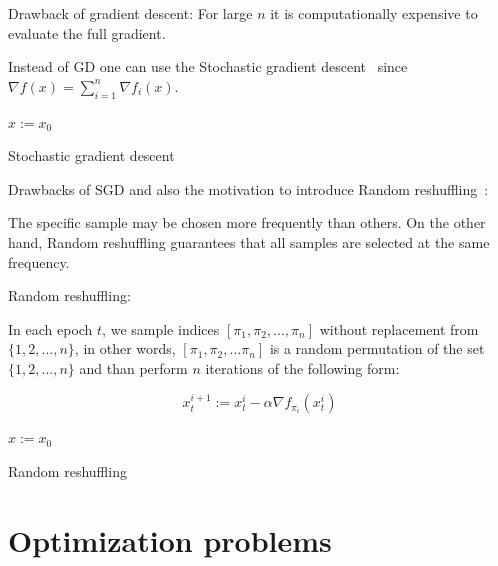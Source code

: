 \documentclass[10pt,conference,compsocconf]{IEEEtran}
\begin{document}
\medskip

Drawback of gradient descent: For large $n$ it is computationally
expensive to evaluate the full gradient.

Instead of GD one can use the Stochastic gradient descent~\cite{SGD} since
$\nabla f(x) = \sum_{i=1}^n \nabla f_i(x)$.

\begin{algorithm}
\SetAlgoLined

  $x:= x_0$ \\
 
 \caption{Stochastic gradient descent}
\end{algorithm}

\medskip

Drawbacks of SGD and also the motivation to introduce Random
reshuffling~\cite{COMPONENTFUNCTION}:

\noindent The specific sample may be chosen more frequently than others. On the
other hand, Random reshuffling guarantees that all samples are selected at
the same frequency.

\medskip

\noindent Random reshuffling:

\noindent In each epoch $t$, we sample indices $[\pi_1, \pi_2,..., \pi_n]$
without replacement from $\{1, 2,..., n\}$, in other words,
$[\pi_1, \pi_2,...\pi_n]$ is a random permutation of the
set $\{1, 2,..., n\}$ and than perform $n$ iterations of the following
form:

$$x_t^{i+1} := x_t^i - \alpha \nabla f_{\pi_i}(x_t^i)$$

\begin{algorithm}
\SetAlgoLined

  $x:= x_0$ \\
 
 \caption{Random reshuffling}
\end{algorithm}

\section{Optimization problems}
\end{document}
